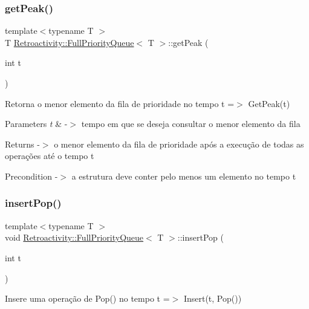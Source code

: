 \subsubsection{\texorpdfstring{get\+Peak()}{getPeak()}}
{\footnotesize\ttfamily template$<$typename T $>$ \\
T \hyperlink{classRetroactivity_1_1FullPriorityQueue}{Retroactivity\+::\+Full\+Priority\+Queue}$<$ T $>$\+::get\+Peak (\begin{DoxyParamCaption}\item[{int}]{t }\end{DoxyParamCaption})}

Retorna o menor elemento da fila de prioridade no tempo t =$>$ Get\+Peak(t)


\begin{DoxyParams}{Parameters}
{\em t} & -\/$>$ tempo em que se deseja consultar o menor elemento da fila \\
\hline
\end{DoxyParams}
\begin{DoxyReturn}{Returns}
-\/$>$ o menor elemento da fila de prioridade após a execução de todas as operações até o tempo t 
\end{DoxyReturn}
\begin{DoxyPrecond}{Precondition}
-\/$>$ a estrutura deve conter pelo menos um elemento no tempo t 
\end{DoxyPrecond}
\mbox{\label{classRetroactivity_1_1FullPriorityQueue_aeafc624a516c36a66a18ba5012866d14}} 
\subsubsection{\texorpdfstring{insert\+Pop()}{insertPop()}}
{\footnotesize\ttfamily template$<$typename T $>$ \\
void \hyperlink{classRetroactivity_1_1FullPriorityQueue}{Retroactivity\+::\+Full\+Priority\+Queue}$<$ T $>$\+::insert\+Pop (\begin{DoxyParamCaption}\item[{int}]{t }\end{DoxyParamCaption})}

Insere uma operação de Pop() no tempo t =$>$ Insert(t, Pop())



